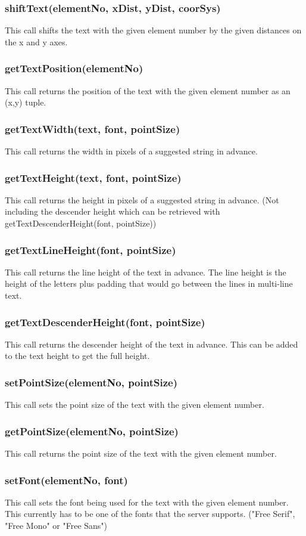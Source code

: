 \documentclass{acm_proc_article-sp}
\begin{document}
\subsubsection{shiftText(elementNo, xDist, yDist, coorSys)}
This call shifts the text with the given element number by the given distances on the x and y axes.
\subsubsection{getTextPosition(elementNo)}
This call returns the position of the text with the given element number as an (x,y) tuple.
\subsubsection{getTextWidth(text, font, pointSize)}
This call returns the width in pixels of a suggested string in advance.
\subsubsection{getTextHeight(text, font, pointSize)}
This call returns the height in pixels of a suggested string in advance. (Not including the descender height which can be retrieved with getTextDescenderHeight(font, pointSize))
\subsubsection{getTextLineHeight(font, pointSize)}
This call returns the line height of the text in advance. The line height is the height of the letters plus padding that would go between the lines in multi-line text.
\subsubsection{getTextDescenderHeight(font, pointSize)}
This call returns the descender height of the text in advance. This can be added to the text height to get the full height.
\subsubsection{setPointSize(elementNo, pointSize)}
This call sets the point size of the text with the given element number.
\subsubsection{getPointSize(elementNo, pointSize)}
This call returns the point size of the text with the given element number.
\subsubsection{setFont(elementNo, font)}
This call sets the font being used for the text with the given element number. This currently has to be one of the fonts that the server supports. ("Free Serif", "Free Mono" or "Free Sans")
\end{document}
